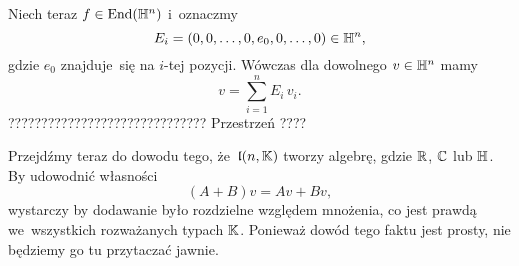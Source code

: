 \documentclass[a4paper,11pt]{article}
\begin{document}
Niech teraz $f \in \mathrm{End}( \mathbb{H}^{ n } )$ i~oznaczmy
\begin{equation}
  \label{eq:Wojtynski-55}
  E_{ i } = ( 0, 0, \ldots, 0, e_{ 0 }, 0, \ldots, 0 ) \in \mathbb{H}^{ n },
\end{equation}
gdzie $e_{ 0 }$ znajduje~się na $i$-tej pozycji. Wówczas dla dowolnego
$v \in \mathbb{H}^{ n }$ mamy
\begin{equation}
  \label{eq:Wojtynski-56}
  v = \sum_{ i = 1 }^{ n } E_{ i } \, v_{ i }.
\end{equation}
??????????????????????????????
Przestrzeń ????

Przejdźmy teraz do dowodu tego, że~$\mathfrak{l}( n, \mathbb{K} )$ tworzy algebrę,
gdzie $\mathbb{R}$, $\mathbb{C}$ lub $\mathbb{H}$. By udowodnić własności
\begin{equation}
  \label{eq:Wojtynski-43}
  ( A + B ) v = A v + B v,
\end{equation}
wystarczy by dodawanie było rozdzielne względem mnożenia, co jest prawdą
we~wszystkich rozważanych typach $\mathbb{K}$. Ponieważ dowód tego faktu jest
prosty, nie będziemy go tu przytaczać jawnie.

\vspace{\spaceFour}














\newpage

\end{document}
